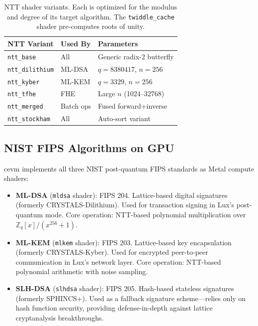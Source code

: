 \documentclass[11pt]{article}
\begin{document}
\begin{table}[h]
\centering
\small
\begin{tabular}{lll}
\toprule
\textbf{NTT Variant} & \textbf{Used By} & \textbf{Parameters} \\
\midrule
\texttt{ntt\_base}       & All         & Generic radix-2 butterfly \\
\texttt{ntt\_dilithium}  & ML-DSA      & $q = 8380417$, $n = 256$ \\
\texttt{ntt\_kyber}      & ML-KEM      & $q = 3329$, $n = 256$ \\
\texttt{ntt\_tfhe}       & FHE         & Large $n$ (1024--32768) \\
\texttt{ntt\_merged}     & Batch ops   & Fused forward+inverse \\
\texttt{ntt\_stockham}   & All         & Auto-sort variant \\
\bottomrule
\end{tabular}
\caption{NTT shader variants. Each is optimized for the modulus and degree of its
target algorithm. The \texttt{twiddle\_cache} shader pre-computes roots of unity.}
\label{tab:ntt}
\end{table}

\subsection{NIST FIPS Algorithms on GPU}

cevm implements all three NIST post-quantum FIPS standards as Metal compute shaders:

\begin{itemize}
\item \textbf{ML-DSA} (\texttt{mldsa} shader): FIPS 204. Lattice-based digital signatures
      (formerly CRYSTALS-Dilithium). Used for transaction signing in Lux's post-quantum mode.
      Core operation: NTT-based polynomial multiplication over $\mathbb{Z}_q[x]/(x^{256}+1)$.

\item \textbf{ML-KEM} (\texttt{mlkem} shader): FIPS 203. Lattice-based key encapsulation
      (formerly CRYSTALS-Kyber). Used for encrypted peer-to-peer communication in Lux's
      network layer. Core operation: NTT-based polynomial arithmetic with noise sampling.

\item \textbf{SLH-DSA} (\texttt{slhdsa} shader): FIPS 205. Hash-based stateless signatures
      (formerly SPHINCS+). Used as a fallback signature scheme---relies only on hash function
      security, providing defense-in-depth against lattice cryptanalysis breakthroughs.
\end{itemize}
\end{document}

